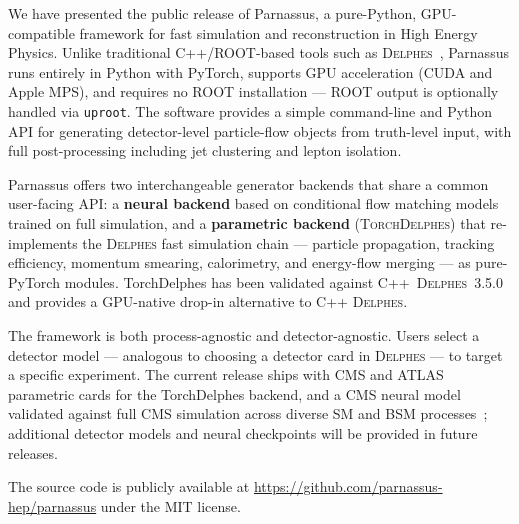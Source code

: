 \documentclass[11pt,a4paper]{article}          %
\begin{document}
We have presented the public release of Parnassus, a pure-Python,
GPU-compatible framework for fast simulation and reconstruction in High
Energy Physics. Unlike traditional C++/ROOT-based tools such as
\textsc{Delphes}~\cite{delphes}, Parnassus runs entirely in Python with
PyTorch, supports GPU acceleration (CUDA and Apple MPS), and requires no ROOT
installation --- ROOT output is optionally handled via \texttt{uproot}. The
software provides a simple command-line and Python API for generating
detector-level particle-flow objects from truth-level input, with full
post-processing including jet clustering and lepton isolation.

Parnassus offers two interchangeable generator backends that share a common
user-facing API: a \textbf{neural backend} based on conditional flow matching
models trained on full simulation, and a \textbf{parametric backend}
(\textsc{TorchDelphes}) that re-implements the \textsc{Delphes} fast simulation
chain --- particle propagation, tracking efficiency, momentum smearing,
calorimetry, and energy-flow merging --- as pure-PyTorch modules.
TorchDelphes has been validated against C++~\textsc{Delphes}~3.5.0 and provides
a GPU-native drop-in alternative to C++ \textsc{Delphes}.

The framework is both process-agnostic and detector-agnostic. Users select a
detector model --- analogous to choosing a detector card in \textsc{Delphes}
--- to target a specific experiment. The current release ships with CMS and
ATLAS parametric cards for the TorchDelphes backend, and a CMS neural model
validated against full CMS simulation across diverse SM and BSM
processes~\cite{parnassus_v1,parnassus_v2}; additional detector models and
neural checkpoints will be provided in future releases.

The source code is publicly available at
\url{https://github.com/parnassus-hep/parnassus} under the MIT license.


\end{document}
